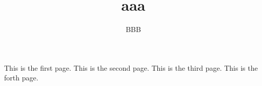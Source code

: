 \documentclass{article}
\title{aaa}
\author{BBB}
\begin{document}
\maketitle
This is the first page.
\newpage
This is the second page.
\newpage
This is the third page.
\newpage
This is the forth page.
\end{document}

